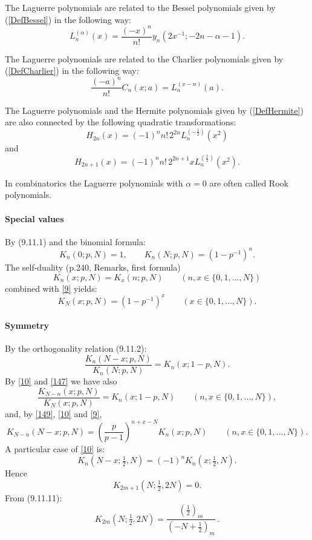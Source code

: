 \documentclass[envcountchap,graybox]{svmono}
\newcounter{rom}
\newcommand\thalf{\tfrac12}
\begin{document}
\noindent
The Laguerre polynomials are related to the Bessel polynomials given by (\ref{DefBessel})
in the following way:
$$L_n^{(\alpha)}(x)=\frac{(-x)^n}{n!}y_n(2x^{-1};-2n-\alpha-1).$$

\noindent
The Laguerre polynomials are related to the Charlier polynomials given by (\ref{DefCharlier})
in the following way:
$$\frac{(-a)^n}{n!}C_n(x;a)=L_n^{(x-n)}(a).$$

\noindent
The Laguerre polynomials and the Hermite polynomials given by (\ref{DefHermite}) are also
connected by the following quadratic transformations:
$$H_{2n}(x)=(-1)^nn!\,2^{2n}L_n^{(-\frac{1}{2})}(x^2)$$
and
$$H_{2n+1}(x)=(-1)^nn!\,2^{2n+1}xL_n^{(\frac{1}{2})}(x^2).$$

\noindent
In combinatorics the Laguerre polynomials with $\alpha=0$ are often called Rook
polynomials.
\label{sec9.11}
%
\paragraph{Special values}
By (9.11.1) and the binomial formula:
\begin{equation}
K_n(0;p,N)=1,\qquad
K_n(N;p,N)=(1-p^{-1})^n.
\label{9}
\end{equation}
The self-duality (p.240, Remarks, first formula)
\begin{equation}
K_n(x;p,N)=K_x(n;p,N)\qquad (n,x\in \{0,1,\ldots,N\})
\label{147}
\end{equation}
combined with \eqref{9} yields:
\begin{equation}
K_N(x;p,N)=(1-p^{-1})^x\qquad(x\in\{0,1,\ldots,N\}).
\label{148}
\end{equation}
%
\paragraph{Symmetry}
By the orthogonality relation (9.11.2):
\begin{equation}
\frac{K_n(N-x;p,N)}{K_n(N;p,N)}=K_n(x;1-p,N).
\label{10}
\end{equation}
By \eqref{10} and \eqref{147} we have also
\begin{equation}
\frac{K_{N-n}(x;p,N)}{K_N(x;p,N)}=K_n(x;1-p,N)
\qquad(n,x\in\{0,1,\ldots,N\}),
\label{149}
\end{equation}
and, by \eqref{149}, \eqref{10} and \eqref{9},
\begin{equation}
K_{N-n}(N-x;p,N)=\left(\frac p{p-1}\right)^{n+x-N}K_n(x;p,N)
\qquad(n,x\in\{0,1,\ldots,N\}).
\label{150}
\end{equation}
A particular case of \eqref{10} is:
\begin{equation}
K_n(N-x;\thalf,N)=(-1)^n K_n(x;\thalf,N).
\label{11}
\end{equation}
Hence
\begin{equation}
K_{2m+1}(N;\thalf,2N)=0.
\label{12}
\end{equation}
From (9.11.11):
\begin{equation}
K_{2m}(N;\thalf,2N)=\frac{(\thalf)_m}{(-N+\thalf)_m}\,.
\label{13}
\end{equation}
%
\end{document}
